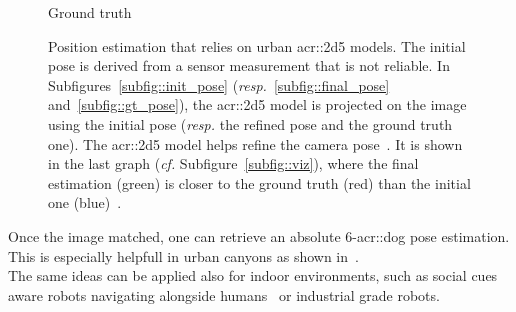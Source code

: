 \begin{figure}[htpb]
{\begin{subfloatrow}[5]
{                        }{
                            \caption{\label{subfig::gt_pose} Ground truth}
                        }
                    \end{subfloatrow}
                }
                {
                    \caption{
                        \label{fig::navigation} Position estimation that relies on urban \gls{acr::2d5} models.
                        The initial pose is derived from a sensor measurement that is not reliable.
                        In Subfigures~\ref{subfig::init_pose} (\textit{resp.}~\ref{subfig::final_pose} and~\ref{subfig::gt_pose}), the \gls{acr::2d5} model is projected on the image using the initial pose (\textit{resp.} the refined pose and the ground truth one).
                        The \gls{acr::2d5} model helps refine the camera pose~\parencite{armagan2017semantic}.
                        It is shown in the last graph (\textit{cf.} Subfigure~\ref{subfig::viz}), where the final estimation (green) is closer to the ground truth (red) than the initial one (blue)~\parencite{armagan2017semantic}.
                    }
                }
            \end{figure}
            Once the image matched, one can retrieve an absolute 6-\gls{acr::dog} pose estimation.
            This is especially helpfull in urban canyons as shown in~\textcite{piasco2018survey}.\\
            The same ideas can be applied also for indoor environments, such as social cues aware robots navigating alongside humans~\parencite{gupta2018social} or industrial grade robots\addref.
       

